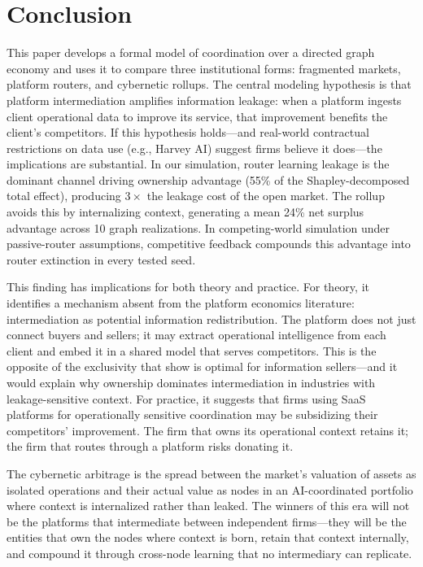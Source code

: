 \documentclass[12pt]{article}
\theoremstyle{definition}
\begin{document}
\section{Conclusion}

This paper develops a formal model of coordination over a directed graph economy and uses it to compare three institutional forms: fragmented markets, platform routers, and cybernetic rollups. The central modeling hypothesis is that platform intermediation amplifies information leakage: when a platform ingests client operational data to improve its service, that improvement benefits the client's competitors. If this hypothesis holds---and real-world contractual restrictions on data use (e.g., Harvey AI) suggest firms believe it does---the implications are substantial. In our simulation, router learning leakage is the dominant channel driving ownership advantage (55\% of the Shapley-decomposed total effect), producing $3\times$ the leakage cost of the open market. The rollup avoids this by internalizing context, generating a mean 24\% net surplus advantage across 10 graph realizations. In competing-world simulation under passive-router assumptions, competitive feedback compounds this advantage into router extinction in every tested seed.

This finding has implications for both theory and practice. For theory, it identifies a mechanism absent from the platform economics literature: intermediation as potential information redistribution. The platform does not just connect buyers and sellers; it may extract operational intelligence from each client and embed it in a shared model that serves competitors. This is the opposite of the exclusivity that \citet{bonatti2022} show is optimal for information sellers---and it would explain why ownership dominates intermediation in industries with leakage-sensitive context. For practice, it suggests that firms using SaaS platforms for operationally sensitive coordination may be subsidizing their competitors' improvement. The firm that owns its operational context retains it; the firm that routes through a platform risks donating it.

The cybernetic arbitrage is the spread between the market's valuation of assets as isolated operations and their actual value as nodes in an AI-coordinated portfolio where context is internalized rather than leaked. The winners of this era will not be the platforms that intermediate between independent firms---they will be the entities that own the nodes where context is born, retain that context internally, and compound it through cross-node learning that no intermediary can replicate.
\end{document}
